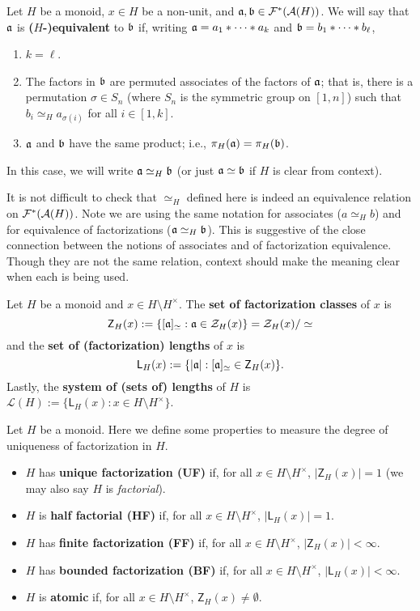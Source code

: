 \begin{defn} \label{def:equivalence}
Let $H$ be a monoid, $x\in H$ be a non-unit, and $\aa,\bb \in \F^*(\A(H))$.
We will say that $\aa$ is \textbf{($H$-)equivalent} to $\bb$ if, writing $\aa = a_1*\cdots * a_k$ and $\bb = b_1*\cdots * b_\ell$,
\begin{enumerate}
\item $k = \ell$.
\item The factors in $\bb$ are permuted associates of the factors of $\aa$; that is, there is a permutation $\sigma\in S_n$ (where $S_n$ is the symmetric group on $[1,n]$) such that $b_i \simeq_H a_{\sigma(i)}$ for all $i\in [1,k]$.
\item $\aa$ and $\bb$ have the same product; i.e., $\pi_H(\aa) = \pi_H(\bb)$.
\end{enumerate}
In this case, we will write $\aa \simeq_H \bb$ (or just $\aa\simeq\bb$ if $H$ is clear from context).
\end{defn}

It is not difficult to check that $\simeq_H$ defined here is indeed an equivalence relation on $\F^*(\A(H))$.
Note we are using the same notation for associates ($a\simeq_H b$) and for equivalence of factorizations ($\aa\simeq_H\bb$).
This is suggestive of the close connection between the notions of associates and of factorization equivalence.
Though they are not the same relation, context should make the meaning clear when each is being used.  

\begin{defn} \label{def:set of lengths}
Let $H$ be a monoid and $x\in H\setminus H^\times$.
The \textbf{set of factorization classes} of $x$ is
\[ \mathsf{Z}_H(x) := \{ [\aa]_{\simeq}: \aa\in \Z_H(x) \} = \Z_H(x)/\simeq \]
and the \textbf{set of (factorization) lengths} of $x$ is
\[ \mathsf{L}_H(x) := \{ |\aa| : [\aa]_{\simeq} \in \mathsf{Z}_H(x) \}. \]
Lastly, the \textbf{system of (sets of) lengths} of $H$ is $\mathcal{L}(H) := \{\mathsf{L}_H(x): x\in H\setminus H^\times\}$.
\end{defn}

\begin{defn} \label{def:factorization properties}
Let $H$ be a monoid.
Here we define some properties to measure the degree of uniqueness of factorization in $H$.
\begin{itemize}
\item $H$ has \textbf{unique factorization (UF)} if, for all $x\in H\setminus H^\times$, $|\mathsf{Z}_H(x)| = 1$ (we may also say $H$ is \textit{factorial}).
\item $H$ is \textbf{half factorial (HF)} if, for all $x\in H\setminus H^\times$, $|\mathsf{L}_H(x)| = 1$.
\item $H$ has \textbf{finite factorization (FF)} if, for all $x\in H\setminus H^\times$, $|\mathsf{Z}_H(x)| <\infty$.
\item $H$ has \textbf{bounded factorization (BF)} if, for all $x\in H\setminus H^\times$, $|\mathsf{L}_H(x)| < \infty$.
\item $H$ is \textbf{atomic} if, for all $x\in H\setminus H^\times$, $\mathsf{Z}_H(x) \neq \emptyset$.
\end{itemize}
\end{defn}

